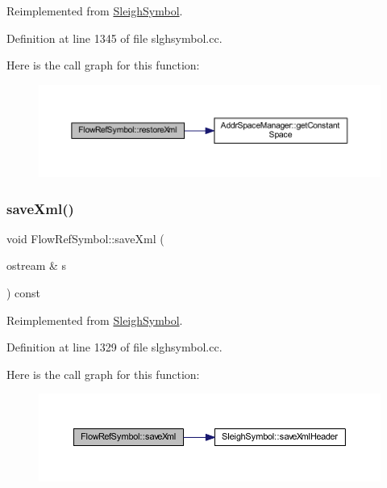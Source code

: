 Reimplemented from \mbox{\hyperlink{class_sleigh_symbol_accaec1696f99366fb0e089a7fceb56a3}{Sleigh\+Symbol}}.



Definition at line 1345 of file slghsymbol.\+cc.

Here is the call graph for this function\+:
\nopagebreak
\begin{figure}[H]
\begin{center}
\leavevmode
\includegraphics[width=350pt]{class_flow_ref_symbol_a64565b89e176acc3743f31133548310d_cgraph}
\end{center}
\end{figure}
\mbox{\label{class_flow_ref_symbol_a6e4019b02ff19539264b2a717828483c}} 
\subsubsection{\texorpdfstring{saveXml()}{saveXml()}}
{\footnotesize\ttfamily void Flow\+Ref\+Symbol\+::save\+Xml (\begin{DoxyParamCaption}\item[{ostream \&}]{s }\end{DoxyParamCaption}) const\hspace{0.3cm}{\ttfamily [virtual]}}



Reimplemented from \mbox{\hyperlink{class_sleigh_symbol_a83c9a32d16419d2277c5b9d542e1cf13}{Sleigh\+Symbol}}.



Definition at line 1329 of file slghsymbol.\+cc.

Here is the call graph for this function\+:
\nopagebreak
\begin{figure}[H]
\begin{center}
\leavevmode
\includegraphics[width=350pt]{class_flow_ref_symbol_a6e4019b02ff19539264b2a717828483c_cgraph}
\end{center}
\end{figure}
\mbox{\label{class_flow_ref_symbol_aa98cb037aedede53c7306aa43cb7310b}} 
